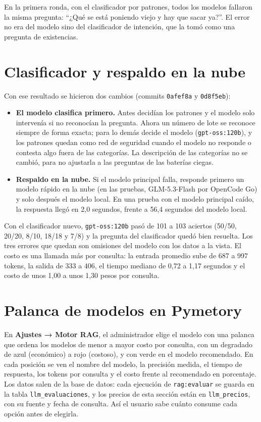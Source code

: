 \documentclass[letterpaper,11pt]{article}
\begin{document}
En la primera ronda, con el clasificador por patrones, todos los modelos fallaron la misma pregunta: ``¿Qué se está poniendo viejo y hay que sacar ya?''. El error no era del modelo sino del clasificador de intención, que la tomó como una pregunta de existencias.

\section{Clasificador y respaldo en la nube}

Con ese resultado se hicieron dos cambios (commits \texttt{0afef8a} y \texttt{0d8f5eb}):

\begin{itemize}[nosep]
\item \textbf{El modelo clasifica primero.} Antes decidían los patrones y el modelo solo intervenía si no reconocían la pregunta. Ahora un número de lote se reconoce siempre de forma exacta; para lo demás decide el modelo (\texttt{gpt-oss:120b}), y los patrones quedan como red de seguridad cuando el modelo no responde o contesta algo fuera de las categorías. La descripción de las categorías no se cambió, para no ajustarla a las preguntas de las baterías ciegas.
\item \textbf{Respaldo en la nube.} Si el modelo principal falla, responde primero un modelo rápido en la nube (en las pruebas, GLM-5.3-Flash por OpenCode Go) y solo después el modelo local. En una prueba con el modelo principal caído, la respuesta llegó en 2,0 segundos, frente a 56,4 segundos del modelo local.
\end{itemize}

Con el clasificador nuevo, \texttt{gpt-oss:120b} pasó de 101 a 103 aciertos (50/50, 20/20, 8/10, 18/18 y 7/8) y la pregunta del clasificador quedó bien resuelta. Los tres errores que quedan son omisiones del modelo con los datos a la vista. El costo es una llamada más por consulta: la entrada promedio sube de 687 a 997 tokens, la salida de 333 a 406, el tiempo mediano de 0,72 a 1,17 segundos y el costo de unos 1,00 a unos 1,30 pesos por consulta.

\section{Palanca de modelos en Pymetory}

En \textbf{Ajustes → Motor RAG}, el administrador elige el modelo con una palanca que ordena los modelos de menor a mayor costo por consulta, con un degradado de azul (económico) a rojo (costoso), y con verde en el modelo recomendado. En cada posición se ven el nombre del modelo, la precisión medida, el tiempo de respuesta, los tokens por consulta y el costo frente al recomendado en porcentaje. Los datos salen de la base de datos: cada ejecución de \texttt{rag:evaluar} se guarda en la tabla \texttt{llm\_evaluaciones}, y los precios de esta sección están en \texttt{llm\_precios}, con su fuente y fecha de consulta. Así el usuario sabe cuánto consume cada opción antes de elegirla.
\end{document}
